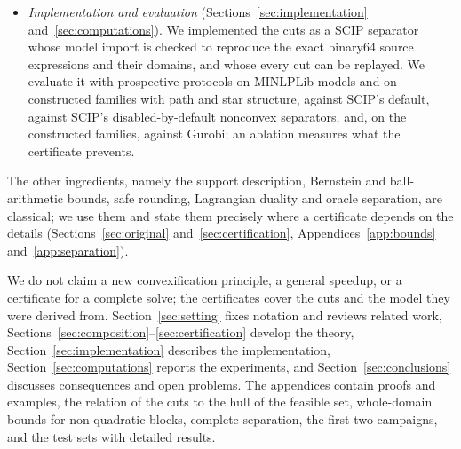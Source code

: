\begin{itemize}
nonnegative combinations of nonlinear rows over their common block domain and
eliminating the rows gives cuts in the original variables, with no auxiliary
variables. Together these cuts describe the projection of the joint-graph
relaxation, and we give conditions under which this projection is the convex
hull of the set that the rows define, and examples where it is not. Validity
of a stored cut rests on four checks: a certified lower bound over the whole
block domain for the exact binary64 direction, exact elimination,
bound-corrected rounding, and a comparison with the row that the solver
stores; the direction itself may be found by any numerical method.
\item \emph{Implementation and evaluation}
(Sections~\ref{sec:implementation} and~\ref{sec:computations}). We implemented
the cuts as a SCIP separator whose model import is checked to reproduce the
exact binary64 source expressions and their domains, and whose every cut can
be replayed. We evaluate it with prospective protocols on MINLPLib models and
on constructed families with path and star structure, against SCIP's default,
against SCIP's disabled-by-default nonconvex separators, and, on the
constructed families, against Gurobi; an ablation measures what the
certificate prevents.
\end{itemize}

The other ingredients, namely the support description, Bernstein and
ball-arithmetic bounds, safe rounding, Lagrangian duality and oracle
separation, are classical; we use them and state them precisely where a
certificate depends on the details (Sections~\ref{sec:original}
and~\ref{sec:certification}, Appendices~\ref{app:bounds}
and~\ref{app:separation}).



We do not claim a new convexification principle, a general speedup, or a
certificate for a complete solve; the certificates cover the cuts and the
model they were derived from. Section~\ref{sec:setting} fixes notation and
reviews related work, Sections~\ref{sec:composition}--\ref{sec:certification}
develop the theory, Section~\ref{sec:implementation} describes the
implementation, Section~\ref{sec:computations} reports the experiments, and
Section~\ref{sec:conclusions} discusses consequences and open problems. The
appendices contain proofs and examples, the relation of the cuts to the hull
of the feasible set, whole-domain bounds for non-quadratic blocks, complete
separation, the first two campaigns, and the test sets with detailed results.

